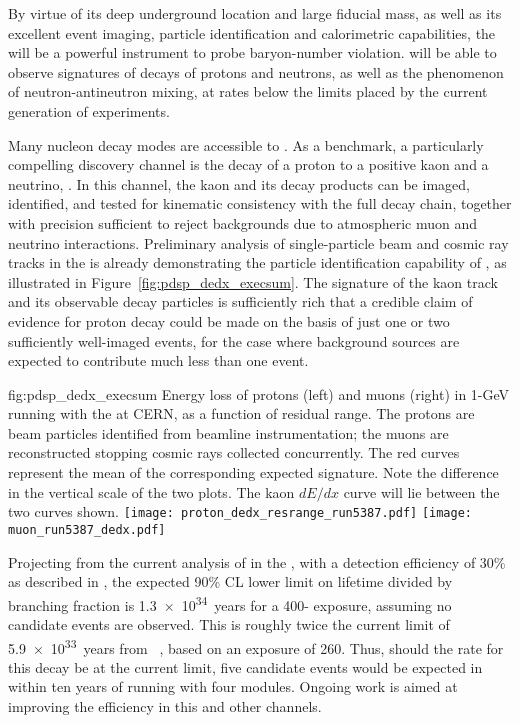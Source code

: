 By virtue of its deep underground location and large fiducial 
mass, as well as its excellent event imaging, particle 
identification and 
calorimetric capabilities, the   will be 
a powerful instrument %
to probe baryon-number violation.
 will be able to observe signatures of decays of protons and 
neutrons, as well as the phenomenon of neutron-antineutron mixing, 
at rates below the limits placed by the current generation of 
experiments.

Many nucleon decay modes are accessible to .  
As a benchmark, a particularly compelling discovery channel 
is the decay of a proton to a positive kaon and a neutrino, 
\ptoknubar.  In this channel, the kaon and its decay products 
can be imaged, identified, and tested for kinematic consistency 
with the full decay chain, together with precision sufficient to 
reject backgrounds due to atmospheric muon and neutrino 
interactions. 
Preliminary analysis of single-particle beam and cosmic ray tracks 
in the   is already demonstrating the particle 
identification capability of , as illustrated in 
Figure~\ref{fig:pdsp_dedx_execsum}.  
The signature of the kaon track and its observable decay particles is 
sufficiently rich that a credible claim of evidence for 
proton decay could be made on the basis of just 
one or two sufficiently well-imaged events, for the case 
where background sources are expected to contribute much less 
than one event.

\begin{dunefigure}{fig:pdsp_dedx_execsum}
{Energy loss of protons (left) and muons (right) in 1-GeV  
running with the   at CERN, as a function of 
residual range.  The protons are beam particles identified from 
beamline instrumentation; the muons are reconstructed stopping 
cosmic rays collected concurrently.  
The red curves represent the mean of the 
corresponding expected signature.  Note the difference in 
the vertical scale of the two plots.  The kaon $dE/dx$ curve 
will lie between the two curves shown.}
\texttt{[image: proton\_dedx\_resrange\_run5387.pdf]}\hspace{0.05\linewidth}
\texttt{[image: muon\_run5387\_dedx.pdf]}
\end{dunefigure}

Projecting from the current analysis of \ptoknubar in the  
, with a detection efficiency of \num{30}\% as 
described in \physchndk, the 
expected 90\% CL lower limit on lifetime divided by branching 
fraction is \SI{1.3e34}{years} for a 
\num{400}-\SI{}{\ktyr} 
exposure, assuming no candidate events are observed.  This 
is roughly twice the current limit of 
\SI{5.9e33}{years} from \superk~\cite{Abe:2014mwa}, 
based on an exposure of \SI{260}{\ktyr}.  Thus, should the rate 
for this decay be at the current \superk limit, five candidate 
events would be expected in  within ten years 
of running with four  modules.  Ongoing work is aimed 
at improving the efficiency in this and other channels.

